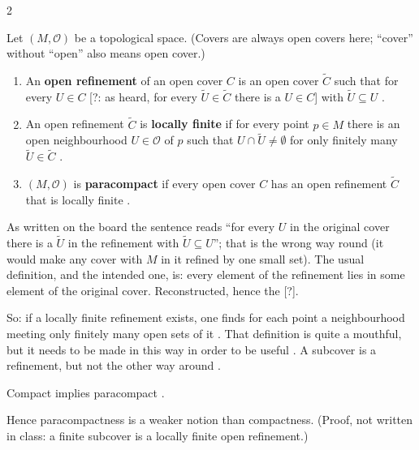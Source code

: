 \begin{paracol}{2}
\begin{definition}\label{def:iv-paracompact}
Let $(M,\mathcal O)$ be a topological space. (Covers are always open covers here; ``cover'' without ``open'' also means open cover.)
\begin{enumerate}
  \item An \textbf{open refinement} of an open cover $C$ is an open cover $\tilde C$ such that for every $U\in C$ [?: as heard, for every $\tilde U\in\tilde C$ there is a $U\in C$]
        with $\tilde U\subseteq U$ .
  \item An open refinement $\tilde C$ is \textbf{locally finite} if for every point $p\in M$ there is an open neighbourhood $U\in\mathcal O$ of $p$ such that
        $U\cap\tilde U\ne\emptyset$ for only finitely many $\tilde U\in\tilde C$ .
  \item $(M,\mathcal O)$ is \textbf{paracompact} if every open cover $C$ has an open refinement $\tilde C$ that is locally finite
        .
\end{enumerate}
\end{definition}
\begin{coursenote}
As written on the board the sentence reads ``for every $U$ in the original cover there is a $\tilde U$ in the refinement with $\tilde U\subseteq U$''; that is the
wrong way round (it would make any cover with $M$ in it refined by one small set). The usual definition, and the intended one, is: every element of the refinement lies in
some element of the original cover. Reconstructed, hence the [?].
\end{coursenote}
So: if a locally finite refinement exists, one finds for each point a neighbourhood meeting only finitely many open sets of it . That
definition is quite a mouthful, but it needs to be made in this way in order to be useful . A subcover is a refinement, but not the other way around
.

\begin{corollary}\label{cor:iv-compact-para}
Compact implies paracompact .
\end{corollary}
Hence paracompactness is a weaker notion than compactness. (Proof, not written in class: a finite subcover is a locally finite open refinement.)


\end{paracol}
